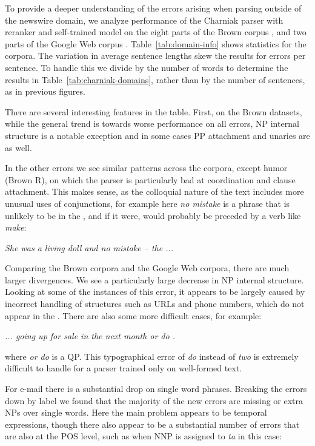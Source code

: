 To provide a deeper understanding of the errors arising when parsing outside of
the newswire domain, we analyze performance of the Charniak parser with
reranker and self-trained model on the eight parts of the Brown corpus
\parencite{ptb}, and two parts of the Google Web
corpus \parencite{Petrov:2012}.  Table~\ref{tab:domain-info} shows statistics for
the corpora.  The variation in average sentence lengths skew the results for
errors per sentence.  To handle this we divide by the number of words to
determine the results in Table~\ref{tab:charniak-domains}, rather than by the
number of sentences, as in previous figures.

There are several interesting features in the table.  First, on the Brown
datasets, while the general trend is towards worse performance on all errors,
NP internal structure is a notable exception and in some cases PP attachment
and unaries are as well.

In the other errors we see similar patterns across the corpora, except humor
(Brown R), on which the parser is particularly bad at coordination and clause
attachment.  This makes sense, as the colloquial nature of the text includes
more unusual uses of conjunctions, for example here \emph{no mistake} is a phrase that is unlikely to be in the \wsj, and if it were, would probably be preceded by a verb like \emph{make}:

\vspace{3mm}
\emph{She was a living doll and no mistake -- the ... }
\vspace{3mm}

Comparing the Brown corpora and the Google Web corpora, there are much larger
divergences.  We see a particularly large decrease in NP internal structure.
Looking at some of the instances of this error, it appears to be largely caused
by incorrect handling of structures such as URLs and phone numbers, which do
not appear in the \ptb.  There are also some more difficult cases, for example:

\vspace{3mm}
\emph{... going up for sale in the next month or do .}
\vspace{3mm}

\noindent where \emph{or do} is a QP.
This typographical error of \emph{do} instead of \emph{two} is extremely difficult to handle for a parser trained only on well-formed text.

For e-mail there is a substantial drop on single word phrases.  Breaking the
errors down by label we found that the majority of the new errors are missing
or extra NPs over single words.  Here the main problem appears to be temporal
expressions, though there also appear to be a substantial number of errors that
are also at the POS level, such as when NNP is assigned to \emph{ta} in this
case:

